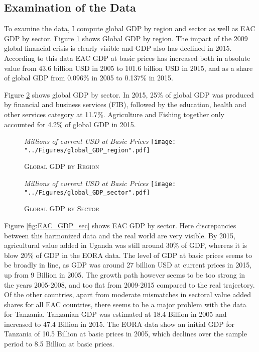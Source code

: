 \documentclass[a4paper]{article}
\begin{document}
\subsection*{Examination of the Data}
To examine the data, I compute global GDP by region and sector as well as EAC GDP by sector. Figure \ref{fig:wld_GDP_reg} shows Global GDP by region. The impact of the 2009 global financial crisis is clearly visible and GDP also has declined in 2015. %
According to this data EAC GDP at basic prices has increased both in absolute value from 43.6 billion USD in 2005 to 101.6 billion USD in 2015, and as a share of global GDP from 0.096\% in 2005 to 0.137\% in 2015. \newline

Figure \ref{fig:wld_GDP_sec} shows global GDP by sector. In 2015, 25\% of global GDP was produced by financial and business services (FIB), followed by the education, health and other services category at 11.7\%. Agriculture and Fishing together only accounted for 4.2\% of global GDP in 2015.




\begin{figure}[h!]
\centering
\caption{\label{fig:wld_GDP_reg}\textsc{Global GDP by Region}}
\small{\textit{Millions of current USD at Basic Prices}}
\texttt{[image: "../Figures/global\_GDP\_region".pdf]} %
\end{figure}
\FloatBarrier

\begin{figure}[h!]
\centering
\caption{\label{fig:wld_GDP_sec}\textsc{Global GDP by Sector}}
\small{\textit{Millions of current USD at Basic Prices}}
\texttt{[image: "../Figures/global\_GDP\_sector".pdf]} %
\end{figure}
\FloatBarrier

Figure \ref{fig:EAC_GDP_sec} shows EAC GDP by sector. Here discrepancies between this harmonized data and the real world are very visible. By 2015, agricultural value added in Uganda was still around 30\% of GDP, whereas it is blow 20\% of GDP in the EORA data. The level of GDP at basic prices seems to be broadly in line, as GDP was around 27 billion USD at current prices in 2015, up from 9 Billion in 2005. The growth path however seems to be too strong in the years 2005-2008, and too flat from 2009-2015 compared to the real trajectory. Of the other countries, apart from moderate mismatches in sectoral value added shares for all EAC countries, there seems to be a major problem with the data for Tanzania. Tanzanian GDP was estimated at 18.4 Billion in 2005 and increased to 47.4 Billion in 2015. The EORA data show an initial GDP for Tanzania of 10.5 Billion at basic prices in 2005, which declines over the sample period to 8.5 Billion at basic prices. \newline
\end{document}

